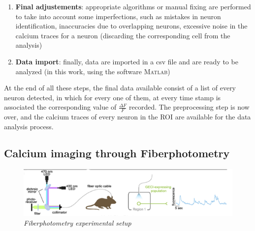 \documentclass[12pt, a4paper]{article}
\begin{document}
\begin{enumerate}
	\item \textbf{Final adjustements}: appropriate algorithms or manual fixing are performed to take into account some imperfections, such as mistakes in neuron identification, inaccuracies due to overlapping neurons, excessive noise in the calcium traces for a neuron (discarding the corresponding cell from the analysis)
	
	\item \textbf{Data import}: finally, data are imported in a csv file and are ready to be analyzed (in this work, using the software \textsc{Matlab})
	
\end{enumerate} 


At the end of all these steps, the final data available consist of a list of every neuron detected, in which for every one of them, at every time stamp is associated the corresponding value of $\frac{\Delta F }{F}$ recorded. The preprocessing step is now over, and the calcium traces of every neuron in the ROI are available for the data analysis process.	


\newpage
\subsection{Calcium imaging through Fiberphotometry} \label{section 1.4}

\begin{figure}[H]
	\begin{center}
		\includegraphics[scale=.45]{fiberphotometry.png} 
	\end{center} 
	\caption{\textit{Fiberphotometry experimental setup}}
	\label{fiberphotometry}
\end{figure}
\end{document}

